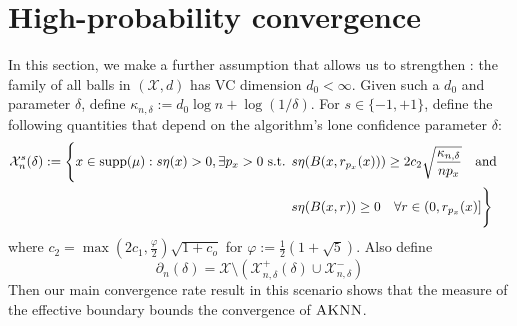 \documentclass{article}
\def\X{{\mathcal X}}
\def\supp{{\rm supp}}
\newcommand{\samp}{S}
\newcommand{\algname}{\textsc{AKNN}}
\newcommand{\new}[1]{\color{red} #1}
\begin{document}
%


\iffalse
\section{High-probability convergence}

In this section, we make a further assumption that allows us to strengthen : 
the family of all balls in $(\X, d)$ has VC dimension $d_0 < \infty$. 
Given such a $d_0$ and parameter $\delta$, define $\kappa_{n, \delta} := d_0 \log n + \log (1/\delta)$. 
For $s \in \{ -1, +1 \}$, define the following quantities that depend on the algorithm's lone confidence parameter $\delta$:
\begin{align*}
\X^{s}_n (\delta)
:= \Bigg\{
x \in \supp(\mu) : s \eta(x) > 0 , \exists p_x > 0 \text{ s.t. } 
&s \eta(B(x,r_{p_x}(x))) \geq 2 c_2 \sqrt{\frac{ \kappa_{n, \delta} }{n p_x}}
\quad\text{and}\quad \\
&s \eta(B(x,r)) \geq 0 \quad\forall r \in (0, r_{p_x}(x)]
\Bigg\}
\end{align*}
where $c_2 = \max(2c_1, \frac{\varphi}{2} ) \sqrt{1 + c_o}$ for $\varphi := \frac{1}{2} (1 + \sqrt{5})$.
Also define 
$$ \partial_n (\delta) = \X \setminus (\X^+_{n,\delta} (\delta) \cup \X^-_{n,\delta}) $$
Then our main convergence rate result in this scenario shows that the measure of the effective boundary bounds the convergence of $\algname$.
\end{document}
